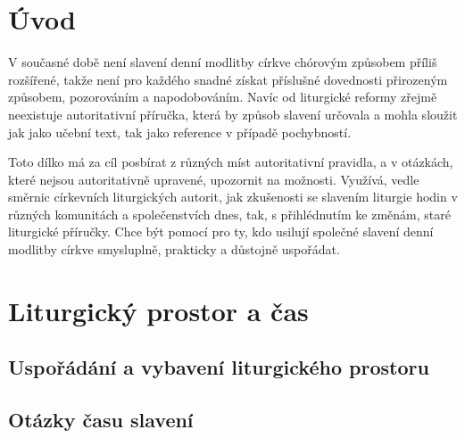 \documentclass[a5paper, twoside]{article}
\newcommand{\titulniStranka}{
  \pagestyle{empty} %
  \begin{titlepage}
    \begin{center}

      \vspace*{5cm}

      {\Large\textbf{\nazev}}

      \vspace{1cm}

      \autor

      \vfill
      In adiutorium

      \onlyyeardate \today
    \end{center}
  \end{titlepage}
}
\newcommand{\autor}{Jakub Pavlík}
\newcommand{\nazev}{
  {\Huge Manuál}
  \vspace{1cm}

  ke společnému slavení\\
  denní modlitby církve
}
\begin{document}
\titulniStranka
\prazdnaStranka

\section*{Úvod}

V současné době není slavení denní modlitby církve chórovým způsobem
příliš rozšířené, takže není pro každého snadné získat příslušné
dovednosti přirozeným způsobem, pozorováním a napodobováním.
Navíc od liturgické reformy zřejmě neexistuje autoritativní příručka,
která by způsob slavení určovala a mohla sloužit jak jako učební text,
tak jako reference v případě pochybností.

Toto dílko má za cíl posbírat z různých míst autoritativní pravidla,
a v otázkách, které nejsou autoritativně upravené, upozornit na možnosti.
Využívá, vedle směrnic církevních liturgických autorit, jak zkušenosti
se slavením liturgie hodin v různých komunitách
a společenstvích dnes, tak, s přihlédnutím ke změnám, staré liturgické
příručky.
Chce být pomocí pro ty, kdo usilují společné slavení denní modlitby církve
smysluplně, prakticky a důstojně uspořádat.



\section{Liturgický prostor a čas}
\subsection{Uspořádání a vybavení liturgického prostoru}
\subsection{Otázky času slavení}




\end{document}
